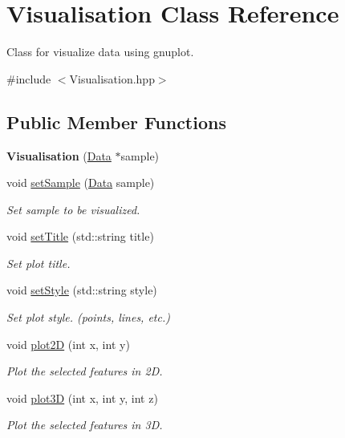 \hypertarget{class_visualisation}{}\section{Visualisation Class Reference}
\label{class_visualisation}


Class for visualize data using gnuplot.  




{\ttfamily \#include $<$Visualisation.\+hpp$>$}

\subsection*{Public Member Functions}
\begin{DoxyCompactItemize}
\item 
\mbox{\label{class_visualisation_a7633f9b6b5350f8d6b6dd3e0aada0927}} 
{\bfseries Visualisation} (\hyperlink{class_data}{Data} $\ast$sample)
\item 
void \hyperlink{class_visualisation_a124977561c36f63108795e849ad0f100}{set\+Sample} (\hyperlink{class_data}{Data} sample)
\begin{DoxyCompactList}\small\item\em Set sample to be visualized. \end{DoxyCompactList}\item 
void \hyperlink{class_visualisation_ac217fcae4984edeb003bfcd208a253de}{set\+Title} (std\+::string title)
\begin{DoxyCompactList}\small\item\em Set plot title. \end{DoxyCompactList}\item 
void \hyperlink{class_visualisation_a2d29fee9180bcb2fd5cb6fc78253ac5b}{set\+Style} (std\+::string style)
\begin{DoxyCompactList}\small\item\em Set plot style. (points, lines, etc.) \end{DoxyCompactList}\item 
void \hyperlink{class_visualisation_a7569c77520391e6adf7e285410f4b358}{plot2D} (int x, int y)
\begin{DoxyCompactList}\small\item\em Plot the selected features in 2D. \end{DoxyCompactList}\item 
void \hyperlink{class_visualisation_a39cf83c146a4c92a32782bfdf6168594}{plot3D} (int x, int y, int z)
\begin{DoxyCompactList}\small\item\em Plot the selected features in 3D. \end{DoxyCompactList}\end{DoxyCompactItemize}



